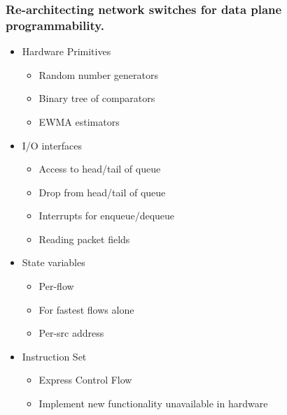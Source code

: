 \begin{frame}[plain]
\frametitle{Re-architecting network switches for data plane programmability.}
\begin{itemize}
\item Hardware Primitives
      \begin{itemize}
      \item Random number generators
      \item Binary tree of comparators
      \item EWMA estimators
      \end{itemize}

\item I/O interfaces
      \begin{itemize}
      \item Access to head/tail of queue
      \item Drop from head/tail of queue
      \item Interrupts for enqueue/dequeue
      \item Reading packet fields
      \end{itemize}

\item State variables
      \begin{itemize}
      \item Per-flow
      \item For fastest flows alone
      \item Per-src address
      \end{itemize}

\item Instruction Set
      \begin{itemize}
      \item Express Control Flow
      \item Implement new functionality unavailable in hardware
      \end{itemize}
\end{itemize}
\end{frame}

